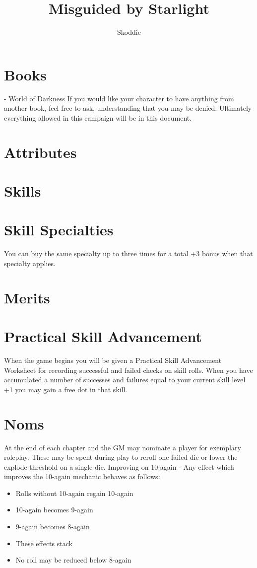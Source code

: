 \documentclass{article}
\title{Misguided by Starlight}
\author{Skoddie}
\begin{document}
\maketitle

\section{Books}
- World of Darkness
If you would like your character to have anything from another book, feel free to ask, understanding that you may be denied. Ultimately everything allowed in this campaign will be in this document.

\section{Attributes}

	

\section{Skills}

	

\section{Skill Specialties}
You can buy the same specialty up to three times for a total +3 bonus when that specialty applies.

\section{Merits}

	

\section{Practical Skill Advancement}
When the game begins you will be given a Practical Skill Advancement Worksheet for recording successful and failed checks on skill rolls. When you have accumulated a number of successes and failures equal to your current skill level +1 you may gain a free dot in that skill.

\section{Noms}
At the end of each chapter and the GM may nominate a player for exemplary roleplay. These may be spent during play to reroll one failed die or lower the explode threshold on a single die.
Improving on 10-again
- Any effect which improves the 10-again mechanic behaves as follows:
\begin{itemize}
	\item Rolls without 10-again regain 10-again
	\item 10-again becomes 9-again
	\item 9-again becomes 8-again
	\item These effects stack
	\item No roll may be reduced below 8-again
\end{itemize}
\end{document}
